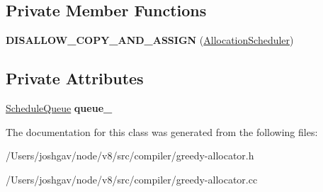\subsection*{Private Member Functions}
\begin{DoxyCompactItemize}
\item 
{\bfseries D\+I\+S\+A\+L\+L\+O\+W\+\_\+\+C\+O\+P\+Y\+\_\+\+A\+N\+D\+\_\+\+A\+S\+S\+I\+GN} (\hyperlink{classv8_1_1internal_1_1compiler_1_1_allocation_scheduler}{Allocation\+Scheduler})\hypertarget{classv8_1_1internal_1_1compiler_1_1_allocation_scheduler_ae506454e2c0219bfc886c8cfe60a8c8f}{}\label{classv8_1_1internal_1_1compiler_1_1_allocation_scheduler_ae506454e2c0219bfc886c8cfe60a8c8f}

\end{DoxyCompactItemize}
\subsection*{Private Attributes}
\begin{DoxyCompactItemize}
\item 
\hyperlink{classv8_1_1internal_1_1_zone_priority_queue}{Schedule\+Queue} {\bfseries queue\+\_\+}\hypertarget{classv8_1_1internal_1_1compiler_1_1_allocation_scheduler_a1783d7d2c7ad1c4169932562f85c95e3}{}\label{classv8_1_1internal_1_1compiler_1_1_allocation_scheduler_a1783d7d2c7ad1c4169932562f85c95e3}

\end{DoxyCompactItemize}


The documentation for this class was generated from the following files\+:\begin{DoxyCompactItemize}
\item 
/\+Users/joshgav/node/v8/src/compiler/greedy-\/allocator.\+h\item 
/\+Users/joshgav/node/v8/src/compiler/greedy-\/allocator.\+cc\end{DoxyCompactItemize}
